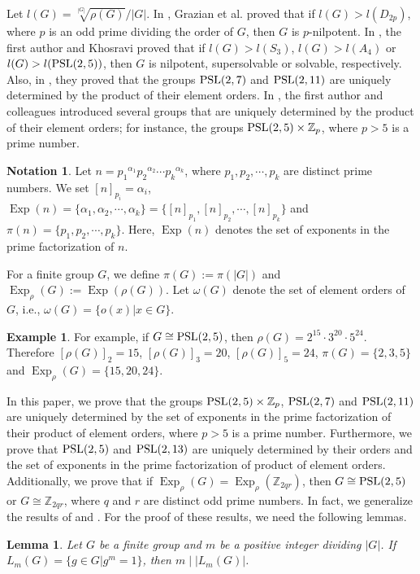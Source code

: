 \documentclass[12pt]{amsart}
\newtheorem{lemma}[theorem]{Lemma}
\theoremstyle{definition}
\newtheorem{example}[theorem]{Example}
\newtheorem{notation}[theorem]{Notation}
\begin{document}
Let $l(G)=\sqrt[|G|]{\rho(G)}/|G|$.
In \cite{Grazian}, Grazian et al. proved that if 
$l(G) > l(D_{2p})$, where $p$ is an odd prime dividing the order of $G$, then  $G$ is $p$-nilpotent.
In \cite{baniAust}, the first author and Khosravi proved that  
if $l(G)>l(S_3)$,  $l(G)>l(A_4)$ or $l(G)>l({\rm PSL}(2,5))$, then
$G$ is nilpotent, supersolvable or   solvable, respectively.
Also, in \cite{baniMal}, they proved that
the groups ${\rm PSL}(2,7)$ and ${\rm PSL}(2,11)$
are uniquely
determined by the product of their element orders.
In \cite{banihamedapplication,banihamedcom}, the first author 
 and colleagues introduced several groups that are uniquely determined by the product of their element orders; for instance,
the groups ${\rm PSL}(2,5) \times \mathbb{Z}_p$, where $p > 5$ is a prime number.






\begin{notation}
	Let  $n={p_1}^{\alpha_1}  {p_2}^{\alpha_2} \cdots  {p_k}^{\alpha_k}$,
where $p_1, p_2, \cdots, p_k$
	are distinct prime numbers.
We set $[n]_{p_i}=\alpha_i$,
$ {\operatorname{Exp}}(n)=\{\alpha_1, \alpha_2,  \cdots, \alpha_k\}=\{[n]_{p_1}, [n]_{p_2}, \cdots, [n]_{p_k}\} $
and $\pi(n)=\{p_1, p_2, \cdots, p_k\}$.
Here, $ {\operatorname{Exp}}(n)$ 
 denotes the set of exponents in the prime factorization of $n$.
 
For a finite group $G$, we define
$\pi(G):= \pi(|G|)$ and
 ${\operatorname{Exp}}_{\rho}(G):={\operatorname{Exp}}(\rho(G))$.
  Let   $\omega(G)$ 
 denote the set of element orders of $G$, i.e., $\omega(G)=\{o(x)|x \in G\}$.
\end{notation}
\begin{example}
	 For example, if $G \cong {\rm PSL}(2,5)$, then  $\rho(G) = 2^{15}\cdot3^{20}\cdot5^{24}$. Therefore
	 $[\rho(G)]_2=15$,  $[\rho(G)]_3=20$,  $[\rho(G)]_5=24$, $\pi(G)=\{2, 3, 5\}$
	  and $ {\operatorname{Exp}}_{\rho}(G)=\{15, 20, 24\}$.
\end{example}




In this paper, we prove that the groups ${\rm PSL}(2, 5) \times \mathbb{Z}_p$, ${\rm PSL}(2, 7)$ and ${\rm PSL}(2, 11)$ are uniquely determined by
the set of exponents in the prime factorization of their product of element orders, where $p>5$ is a prime number.
 Furthermore, we prove that ${\rm PSL}(2, 5)$ and ${\rm PSL}(2, 13)$
are uniquely determined by their orders and  the set of exponents in the prime factorization of  product of element orders.
Additionally, we prove that 
if  ${\operatorname{Exp}}_{\rho}(G) =  {\operatorname{Exp}}_{\rho}(\mathbb{Z}_{2qr})$, then $G \cong {\rm PSL}(2, 5)$  or $ G \cong \mathbb{Z}_{2qr}$,
where  $q$ and $r$ are distinct  odd prime numbers.
In fact, we generalize the results of \cite{baniMal} and \cite[Theorem 2.3]{banihamedcom}.
For the proof of these results, we need the following lemmas.
	\begin{lemma}\cite{frobenius1895verallgemeinerung}
	Let $G$ be a finite group and $m$ be a positive integer dividing $|G|$. If
	$L_m(G) = \lbrace g \in G|g^m = 1\rbrace$, then $m \mid |L_m(G)|$.
\end{lemma}
\end{document}
